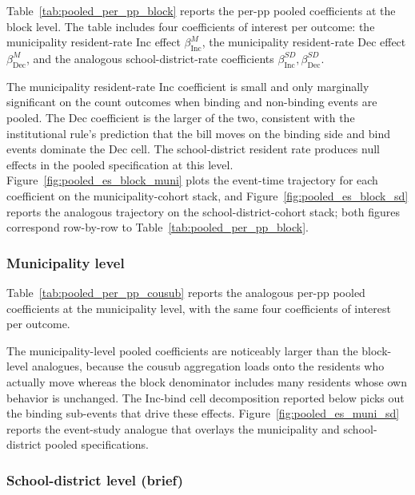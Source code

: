 \documentclass[12pt]{article}
\begin{document}
Table~\ref{tab:pooled_per_pp_block} reports the per-pp pooled
coefficients at the block level. The table includes four coefficients
of interest per outcome: the municipality resident-rate Inc effect
$\beta^{M}_{\text{Inc}}$, the municipality resident-rate Dec effect
$\beta^{M}_{\text{Dec}}$, and the analogous school-district-rate
coefficients $\beta^{SD}_{\text{Inc}}, \beta^{SD}_{\text{Dec}}$.



The municipality resident-rate Inc coefficient is small and only
marginally significant on the count outcomes when binding and
non-binding events are pooled. The Dec coefficient is the larger
of the two, consistent with the institutional rule's prediction
that the bill moves on the binding side and bind events
dominate the Dec cell. The school-district resident rate produces
null effects in the pooled specification at this level.
Figure~\ref{fig:pooled_es_block_muni} plots the event-time
trajectory for each coefficient on the municipality-cohort stack,
and Figure~\ref{fig:pooled_es_block_sd} reports the analogous
trajectory on the school-district-cohort stack; both figures
correspond row-by-row to Table~\ref{tab:pooled_per_pp_block}.

\subsubsection{Municipality level}
\label{subsubsec:pooled-municipality}

Table~\ref{tab:pooled_per_pp_cousub} reports the analogous per-pp
pooled coefficients at the municipality level, with the same four
coefficients of interest per outcome.



The municipality-level pooled coefficients are noticeably larger
than the block-level analogues, because the cousub aggregation
loads onto the residents who actually move whereas the block
denominator includes many residents whose own behavior is
unchanged. The Inc-bind cell decomposition reported below picks
out the binding sub-events that drive these effects.
Figure~\ref{fig:pooled_es_muni_sd} reports the event-study analogue
that overlays the municipality and school-district pooled
specifications.

\subsubsection{School-district level (brief)}
\label{subsubsec:pooled-sd}
\end{document}
